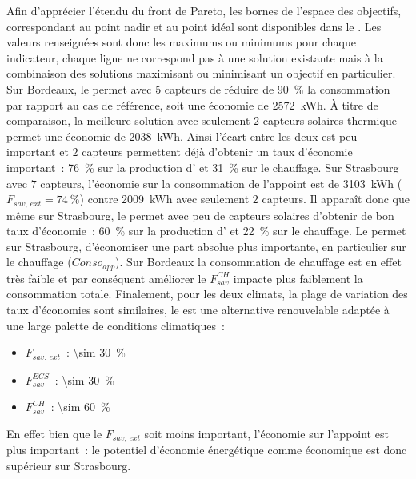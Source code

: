 Afin d’apprécier l’étendu du front de Pareto, les bornes de l’espace des objectifs,
correspondant au point nadir et au point idéal sont disponibles dans le
 . Les valeurs renseignées sont donc les maximums ou
minimums pour chaque indicateur, chaque ligne ne correspond pas à une solution existante
mais à la combinaison des solutions maximisant ou minimisant un objectif en particulier.
Sur Bordeaux, le  permet avec $5$ capteurs de réduire de
\SI{90}{\percent} la consommation par rapport au cas de référence, soit une économie de
\SI{2572}{kWh}. À titre de comparaison, la meilleure solution avec
seulement $2$ capteurs solaires thermique permet une économie de \SI{2038}{kWh}. Ainsi
l’écart entre les deux est peu important et $2$ capteurs permettent déjà d’obtenir un taux
d’économie important~: \SI{76}{\percent} sur la production d’ et
\SI{31}{\percent} sur le chauffage. Sur Strasbourg avec $7$ capteurs, l’économie
sur la consommation de l’appoint  est de \SI{3103}{kWh} ($F_{sav,\, ext} = \SI{74}{\percent}$)
contre \SI{2009}{kWh} avec seulement $2$ capteurs. Il apparaît donc que même sur Strasbourg, le
 permet avec peu de capteurs solaires d’obtenir de bon taux d’économie~:
\SI{60}{\percent} sur la production d’ et \SI{22}{\percent} sur le chauffage.
Le  permet sur Strasbourg, d’économiser une part absolue plus importante, en
particulier sur le chauffage ($Conso_{app}$). Sur Bordeaux la consommation de chauffage
est en effet très faible et par conséquent améliorer le $F_{sav}^{CH}$ impacte plus
faiblement la consommation totale. Finalement, pour les deux climats, la plage de
variation des taux d’économies sont similaires, le  est une alternative
renouvelable adaptée à une large palette de conditions climatiques~:
\begin{itemize}
    \item $F_{sav,\, ext}$~: \SI{\sim 30}{\percent}
    \item $F_{sav}^{ECS}$~: \SI{\sim 30}{\percent}
    \item $F_{sav}^{CH}$~: \SI{\sim 60}{\percent}
\end{itemize}
En effet bien que le $F_{sav,\, ext}$ soit moins important, l’économie sur l’appoint
est plus important~: le potentiel d’économie énergétique comme économique est donc supérieur
sur Strasbourg.

